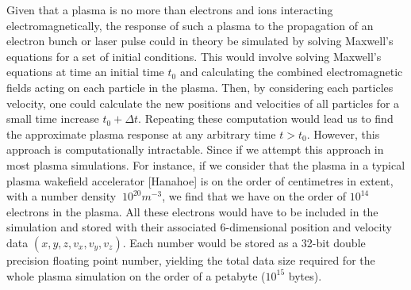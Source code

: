 \begin{itemize}





\indent Given that a plasma is no more than electrons and ions interacting electromagnetically, the response of such a plasma to the propagation of an electron bunch or laser pulse could in theory be simulated by solving Maxwell's equations for a set of initial conditions. This would involve solving Maxwell's equations at time an initial time $t_0$ and calculating the combined electromagnetic fields acting on each particle in the plasma. Then, by considering each particles velocity, one could calculate the new positions and velocities of all particles for a small time increase $t_0+\Delta t$. Repeating these computation would  lead us to find the approximate plasma response at any arbitrary time $t>t_0$. However, this approach is computationally intractable. Since if we attempt this approach in most plasma simulations. For instance, if we consider that the plasma in a typical plasma wakefield accelerator [Hanahoe] is on the order of centimetres in extent, with a number density $~10^{20} m^{-3}$, we find that we have on the order of $10^{14}$ electrons in the plasma. All these electrons would have to be included in the simulation and stored with their associated 6-dimensional position and velocity data $(x,y,z,v_x,v_y,v_z)$. Each number would be stored as a 32-bit double precision floating point number, yielding the total data size required for the whole plasma simulation on the order of a petabyte ($10^{15}$ bytes).\\






\end{itemize}
